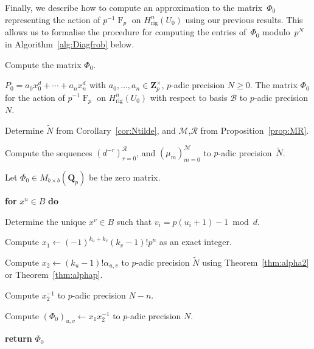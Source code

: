 \documentclass[a4paper,11pt]{article}
\numberwithin{equation}{section}
\newcommand{\ZZ}{\mathbf{Z}} %
\newcommand{\QQ}{\mathbf{Q}} %
\DeclareMathOperator{\Frob}{F}           %
\providecommand{\Hrig}{H_{\text{rig}}}  %
\providecommand{\cB}{\mathcal{B}} %
\theoremstyle{definition}
\begin{document}
Finally, we describe how to compute an approximation to the matrix~$\Phi_0$ 
representing the action of $p^{-1} \Frob_p$ on $\Hrig^{n}(U_0)$ using our 
previous results. This allows us to formalise the procedure for computing 
the entries of~$\Phi_0$ modulo~$p^N$ in Algorithm~\ref{alg:Diagfrob} 
below.

\begin{algorithm}
\caption{Compute the matrix $\Phi_0$.}
\label{alg:Diagfrob}
\begin{algorithmic}
\vspace{1mm}
\Require $P_0=a_0 x_0^d + \dotsb + a_n x_n^d$ 
         with $a_0,\dotsc,a_n \in \ZZ_p^{\times}$, 
         $p$-adic precision $N \geq 0$.
\Ensure  The matrix $\Phi_0$ for the action of $p^{-1} \Frob_p$ on $\Hrig^n(U_0)$ with respect to basis $\cB$ to $p$-adic precision $N$.
\State \begin{compactenum}[{\hspace{1em}} 1.] \vspace{-1.24em}
\item Determine $\tilde{N}$ from Corollary~\ref{cor:Ntilde}, and $\mathcal{M}$,$\mathcal{R}$ from Proposition~\ref{prop:MR}. 
\item Compute the sequences $(d^{-r})_{r=0}^{\mathcal{R}}$, and $(\mu_{m})_{m=0}^{\mathcal{M}}$ 
      to $p$-adic precision~$\tilde{N}$.
\item Let $\Phi_0 \in M_{b \times b}(\QQ_p)$ be the zero matrix.
\item[] \textbf{for} $x^u \in B$ \textbf{do} 
\item[] \begin{compactenum}[{\hspace{1em}} 1.]
        \item Determine the unique $x^v \in B$ such that $v_i = p (u_i + 1) - 1 \bmod{d}$.
        \item Compute $x_1 \gets (-1)^{k_u+k_v} (k_v-1)! p^n$ as an exact integer.
        \item Compute $x_2 \gets (k_u - 1)! \alpha_{u,v}$ to $p$-adic precision $\tilde{N}$ using Theorem~\ref{thm:alpha2} or 
              Theorem~\ref{thm:alphap}.
        \item Compute $x_2^{-1}$ to $p$-adic precision $N-n$.
        \item Compute $(\Phi_0)_{u,v} \gets x_1 x_2^{-1}$ to $p$-adic precision $N$.
      \end{compactenum}   
 \item \textbf{return} $\Phi_0$      
\end{compactenum}
\EndProcedure
\end{algorithmic}
\end{algorithm}
\end{document}
